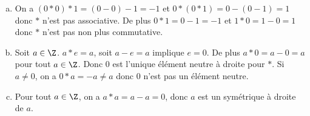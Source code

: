 \begin{enumerate}[a)]
\item On a $(0*0)*1 = (0-0)-1 = -1$ et $0*(0*1) = 0-(0-1) = 1$ donc $*$ n'est
pas associative.  De plus $0*1 = 0-1 = -1$ et $1*0 = 1-0 = 1$ donc $*$ n'est
pas non plus commutative.

\item Soit $a\in\Z$. $a*e = a$, soit $a-e = a$ implique $e = 0$.  De plus $a*0
= a-0 = a$ pour tout $a\in\Z$.  Donc $0$ est l'unique élément neutre à droite
pour $*$.  Si $a \neq 0$, on a $0*a = -a \neq a$ donc $0$ n'est pas un élément
neutre.

\item Pour tout $ a\in\Z$, on a $a*a = a-a = 0$, donc $a$ est un symétrique à
droite de $a$.  
\end{enumerate}


